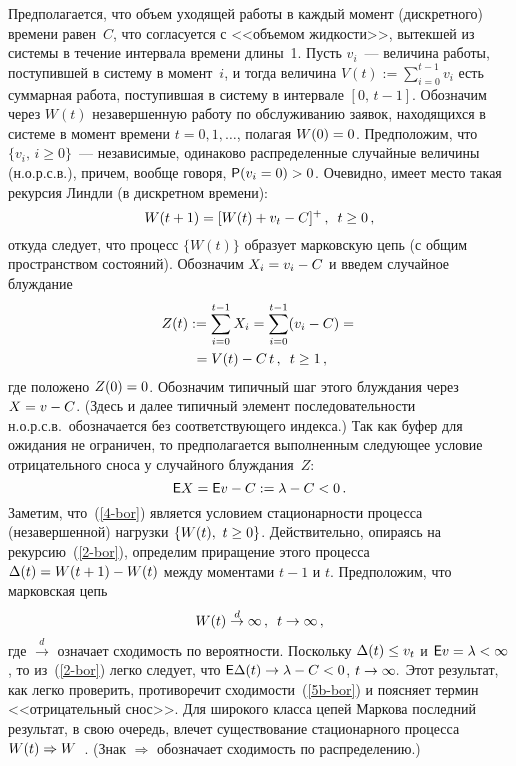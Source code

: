 \begin{multicols}{2}
 Предполагается, что объем уходящей работы в каждый  момент (дискретного) времени
равен~$C$, что согласуется с <<объемом жидкости>>, вытекшей из
системы в течение  интервала времени длины~1.
 Пусть $v_i$~--- величина работы,
поступившей в сис\-те\-му в момент~$i$, и тогда
величина $V(t):=\sum\limits_{i=0}^{t-1} v_i$ есть суммарная работа,
поступившая в систему в интервале  $[0,\,t-1]$. Обозначим через
 $W(t)$  незавершенную работу по
обслуживанию заявок, находящихся в системе в момент  времени
$t=0,1,\ldots$, полагая  $W(0)\hm=0$.
 Предположим, что $\{v_i,\,i\ge 0\}$~--- независимые, одинаково
распределенные случайные величины (н.о.р.с.в.), причем,  вообще
говоря, $\p(v_i=0)\hm>0$. Очевидно, имеет место такая рекурсия Линдли
(в дискретном времени):
\begin{equation}
W(t+1)=[W(t)+v_{t}-C]^+\,,\enskip t\ge0\,,
\label{2-bor}
\end{equation}
откуда следует, что процесс $\{W(t)\}$ образует марковскую цепь (с
общим пространством состояний). Обозначим $X_i\hm=v_i\hm-C$ и введем
случайное  блуждание
\begin{multline}
Z(t):=\sum\limits_{i=0}^{t-1} X_i=\sum\limits_{i=0}^{t-1}(v_{i}-C)={}\\{}=V(t)-C\,
t\,,\enskip t\ge1\,,\label{3-bor}
\end{multline}
где положено   $Z(0)\hm=0$. Обозначим  типичный шаг этого блуждания
через $X\hm=v\hm-C$. (Здесь и далее типичный элемент последовательности
н.о.р.с.в.\ обозначается без соответствующего индекса.) Так как
буфер для ожидания не ограничен, то предполагается  выполненным
следующее условие отрицательного сноса у случайного блуждания~$Z$:
\begin{equation}
{\sf E} X={\sf E} v- C:=\lambda-C<0\,. \label{4-bor}
\end{equation}
Заметим, что~(\ref{4-bor}) является условием стационарности
процесса (незавершенной) нагрузки $\{W(t),\ t\hm\ge 0\}$.
Действительно, опираясь на рекурсию~(\ref{2-bor}), определим приращение
этого процесса $ \Delta(t)\hm=W(t+1)\hm-W(t)$
 между моментами  $t-1$ и $t$. Предположим, что марковская цепь
\begin{equation}
W(t)\stackrel{d}{\to} \infty\,,\enskip t\to   
\infty\,,
\label{5b-bor}
\end{equation} 
где $\stackrel{d}{\to}$  означает сходимость по вероятности.
 Поскольку $\Delta(t)\hm\le  v_t$ и $\e v\hm=\lambda\hm<\infty$, то  из~(\ref{2-bor}) 
 легко следует, что
$ \e \Delta (t)\hm\to \lambda\hm-C\hm<0$, $t\hm\to \infty. $ Этот результат,
как легко проверить, противоречит сходимости~(\ref{5b-bor}) и  поясняет
термин <<отрицательный снос>>. Для широкого класса цепей Маркова
последний результат, в свою очередь, влечет существование
стационарного процесса $W(t)\hm\Rightarrow W$~\cite{Asmus}. (Знак
$\Rightarrow $ обозначает сходимость по распределению.)


\end{multicols}
